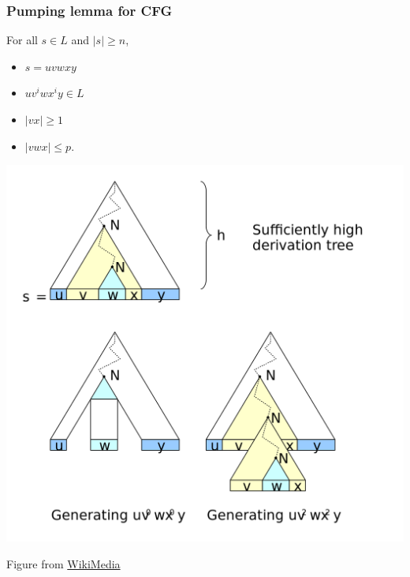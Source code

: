 \documentclass[languages_and_machines.tex]{subfiles}
\begin{document}
\begin{frame}
  \frametitle{Pumping lemma for CFG}

  \begin{minipage}{0.3\textwidth}
    \small
    For all \(s \in L\) and \(\lvert s \rvert \geq n\),
    \begin{itemize}
    \item \(s = uvwxy\)
    \item \(uv^i w x^i y \in L\)
    \item \(\lvert vx \rvert \geq 1\) 
    \item \(\lvert vwx \rvert \leq p\).
    \end{itemize}
  \end{minipage}
  \hfill\pause
  \begin{minipage}{0.68\textwidth}
    \includegraphics[width=\textwidth]{pumping_lemma_for_cfg.png}

    {\tiny Figure from \href{https://commons.wikimedia.org/wiki/File:Pumping_lemma_for_context-free_languages.svg}{WikiMedia}}
  \end{minipage}
\end{frame}
\end{document}
